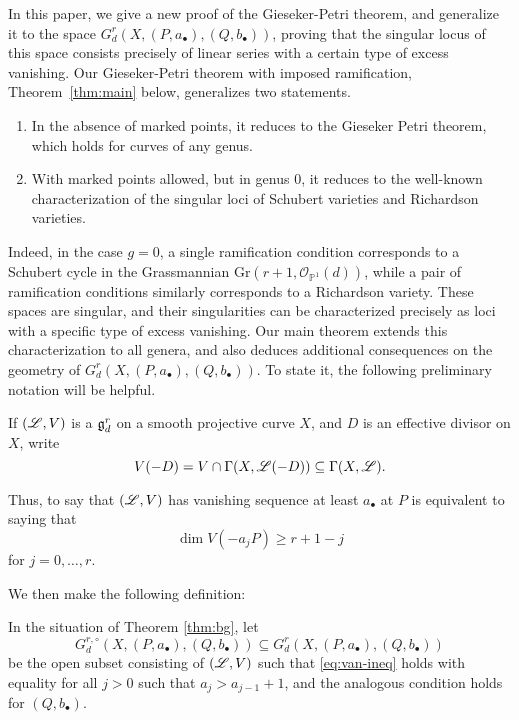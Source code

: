 \documentclass{amsart}
\begin{document}
In this paper, we give a new proof of the Gieseker-Petri theorem, and
generalize it to the space $G^r_d(X,(P,a_{\bullet}),(Q,b_{\bullet}))$,
proving that the singular locus of this space consists precisely of linear series with a certain type of excess vanishing.  
Our Gieseker-Petri theorem with imposed ramification, Theorem~\ref{thm:main} below, generalizes two statements.
\begin{enumerate}
\item In the absence of marked points, it reduces to the Gieseker Petri theorem, which holds for curves of any genus.
\item With marked points allowed, but in genus $0$, it reduces to the well-known characterization of the singular loci of Schubert varieties and Richardson varieties.
\end{enumerate}

Indeed, in the case $g=0$, a single ramification condition corresponds to a
Schubert cycle in the Grassmannian $\mathrm{Gr}(r+1,\mathcal{O}_{\mathbb{P}^1}\!(d))$, while a pair of ramification 
conditions similarly corresponds to a Richardson variety. These spaces are
singular, and their singularities can be characterized precisely as
loci with a specific type of excess vanishing. Our main theorem
extends this characterization to all genera, and also deduces additional
consequences on the geometry of $G^r_d(X,(P,a_{\bullet}),(Q,b_{\bullet}))$.
To state it, the following preliminary notation will be helpful.

\begin{notn} If $({\mathscr L},V)$ is a ${\mathfrak g}^r_d$ on a smooth projective curve
$X$, and $D$ is an effective divisor on $X$, write
$$V(-D)=V \cap \Gamma(X,{\mathscr L}(-D)) \subseteq \Gamma(X,{\mathscr L}).$$
\end{notn}

Thus, to say that $({\mathscr L},V)$ has vanishing sequence at least $a_{\bullet}$  
at $P$ is equivalent to saying that 
\begin{equation}\label{eq:van-ineq} 
\dim V(-a_j P) \geq r+1-j
\end{equation}
for $j=0,\dots,r$.

We then make the following definition:

\begin{defn}\label{defn:good-open} In the situation of Theorem
\ref{thm:bg}, let
$$G^{r,\circ}_d(X,(P,a_{\bullet}),(Q,b_{\bullet})) \subseteq G^r_d(X,(P,a_{\bullet}),(Q,b_{\bullet}))$$
be the open subset consisting of $({\mathscr L},V)$ such that
\eqref{eq:van-ineq} holds with equality for all $j>0$ such that 
$a_j>a_{j-1}+1$, and the analogous condition holds for  $(Q,b_\bullet)$.
\end{defn}
\end{document}
